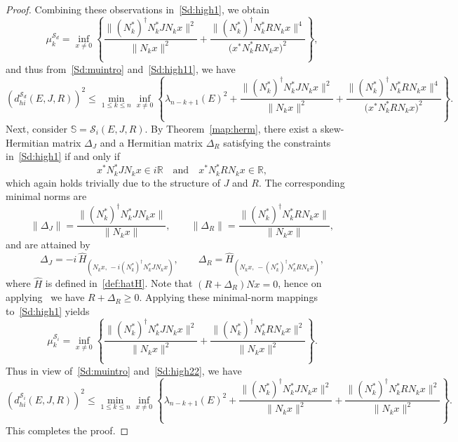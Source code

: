 \documentclass[11pt]{article}
\begin{document}
\begin{proof}
    Combining these observations in~\eqref{Sd:high1}, we obtain
    \begin{equation}\label{Sd:high11}
    \mu_k^{\mathcal S_d} =  \inf_{x \neq 0} \left\{
    \frac{\|(N_k^*)^{\dagger} N_k^* J N_k x\|^2}{\|N_k x\|^2} +
    \frac{\|(N_k^*)^{\dagger} N_k^* R N_k x\|^4}{\big(x^* N_k^* R N_k x\big)^2} \right\},
    \end{equation}
       and thus from~\eqref{Sd:muintro} and~\eqref{Sd:high11}, we have
    \[
    (d_{hi}^{\mathcal S_d}(E,J,R))^2 \le \min_{1 \le k \le n} \inf_{x \neq 0} \left\{ \lambda_{n-k+1}(E)^2 +
    \frac{\|(N_k^*)^{\dagger} N_k^* J N_k x\|^2}{\|N_k x\|^2} +
    \frac{\|(N_k^*)^{\dagger} N_k^* R N_k x\|^4}{\big(x^* N_k^* R N_k x\big)^2} \right\}.
    \]
    Next, consider $\mathbb S=\mathcal S_i(E,J,R)$. By Theorem~\ref{map:herm}, there exist a skew-Hermitian matrix $\Delta_J$ and a Hermitian matrix $\Delta_R$ satisfying the constraints in~\eqref{Sd:high1} if and only if
    \[
    x^* N_k^* J N_k x \in i\mathbb{R}
    \quad \text{and} \quad
    x^* N_k^* R N_k x \in \mathbb{R},
    \]
    which again holds trivially due to the structure of $J$ and $R$.
    The corresponding minimal norms are
    \[
    \|\Delta_J\| = \frac{\|(N_k^*)^{\dagger} N_k^* J N_k x\|}{\|N_k x\|},
    \qquad
    \|\Delta_R\| = \frac{\|(N_k^*)^{\dagger} N_k^* R N_k x\|}{\|N_k x\|},
    \]
    and are attained by
    \[
    \Delta_J = -i\,\hat H_{(N_k x,\, -i (N_k^*)^{\dagger} N_k^* J N_k x)},
    \qquad
    \Delta_R = \hat H_{(N_k x,\,-(N_k^*)^{\dagger} N_k^* R N_k x)},
    \]
    where $\hat H$ is defined in~\eqref{def:hatH}. Note that $(R+\Delta_R)Nx=0$, hence on applying~\cite[Lemma 4.4]{MehMS16} we have $R+\Delta_R\geq 0$.
    Applying these minimal-norm mappings to~\eqref{Sd:high1} yields
    \begin{equation}\label{Sd:high22}
    \mu_k^{\mathcal S_i} =  \inf_{x \neq 0} \left\{
    \frac{\|(N_k^*)^{\dagger} N_k^* J N_k x\|^2}{\|N_k x\|^2} +
    \frac{\|(N_k^*)^{\dagger} N_k^* R N_k x\|^2}{\|N_k x\|^2} \right\}.
    \end{equation}
    Thus in view of~\eqref{Sd:muintro} and~\eqref{Sd:high22}, we have
    \[
    (d_{hi}^{\mathcal S_i}(E,J,R))^2 \le \min_{1 \le k \le n} \inf_{x \neq 0} \left\{
    \lambda_{n-k+1}(E)^2 +
    \frac{\|(N_k^*)^{\dagger} N_k^* J N_k x\|^2}{\|N_k x\|^2} +
    \frac{\|(N_k^*)^{\dagger} N_k^* R N_k x\|^2}{\|N_k x\|^2} \right\}.
    \]
    This completes the proof.

\end{proof}
\end{document}
